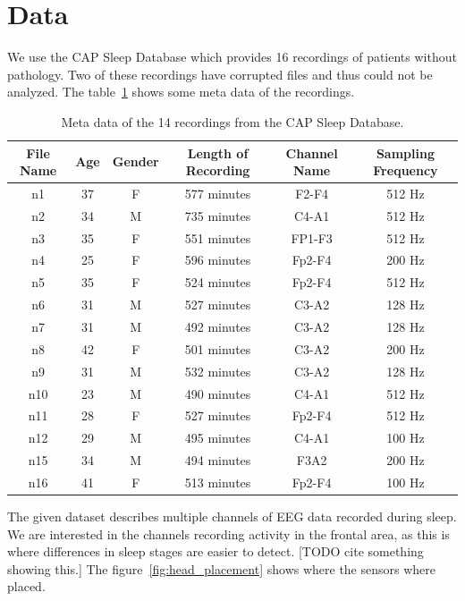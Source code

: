 \section{Data}
\label{sec:data}

We use the CAP Sleep Database\cite{Terzano2001}\cite{Goldberger2000} which provides 16 recordings of patients without pathology. Two of these recordings have corrupted files and thus could not be analyzed. The table~\ref{tab:meta_data_of_recordings} shows some meta data of the recordings.

\begin{table}
	\centering
	\begin{tabular}{c|c|c|c|c|c}
		File Name & Age & Gender & Length of Recording & Channel Name & Sampling Frequency \\
		\hline
		n1  & 37 & F & 577 minutes & F2-F4  & 512 Hz \\
		n2  & 34 & M & 735 minutes & C4-A1  & 512 Hz \\
		n3  & 35 & F & 551 minutes & FP1-F3 & 512 Hz \\
		n4  & 25 & F & 596 minutes & Fp2-F4 & 200 Hz \\
		n5  & 35 & F & 524 minutes & Fp2-F4 & 512 Hz \\
		n6  & 31 & M & 527 minutes & C3-A2  & 128 Hz \\
		n7  & 31 & M & 492 minutes & C3-A2  & 128 Hz \\
		n8  & 42 & F & 501 minutes & C3-A2  & 200 Hz \\
		n9  & 31 & M & 532 minutes & C3-A2  & 128 Hz \\
		n10 & 23 & M & 490 minutes & C4-A1  & 512 Hz \\
		n11 & 28 & F & 527 minutes & Fp2-F4 & 512 Hz \\
		n12 & 29 & M & 495 minutes & C4-A1  & 100 Hz \\
		n15 & 34 & M & 494 minutes & F3A2   & 200 Hz \\
		n16 & 41 & F & 513 minutes & Fp2-F4 & 100 Hz \\
	\end{tabular}
	\caption{Meta data of the 14 recordings from the CAP Sleep Database.}
	\label{tab:meta_data_of_recordings}
\end{table}

The given dataset describes multiple channels of EEG data recorded during sleep. We are interested in the channels recording activity in the frontal area, as this is where differences in sleep stages are easier to detect. [TODO cite something showing this.] The figure~\ref{fig:head_placement} shows where the sensors where placed.

